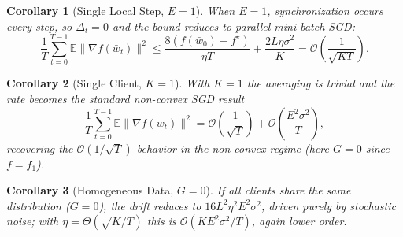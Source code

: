 \documentclass[11pt]{article}
\newtheorem{corollary}{Corollary}
\begin{document}
\begin{corollary}[Single Local Step, $E=1$]
When $E=1$, synchronization occurs every step, so $\Delta_t = 0$ and the bound
reduces to parallel mini-batch SGD:
\[
\frac{1}{T}\sum_{t=0}^{T-1}\mathbb{E}\|\nabla f(\bar w_t)\|^2
\le \frac{8(f(\bar w_0)-f^\star)}{\eta T} + \frac{2L\eta\sigma^2}{K}
= \mathcal{O}\!\left(\frac{1}{\sqrt{KT}}\right).
\]
\end{corollary}

\begin{corollary}[Single Client, $K=1$]
With $K=1$ the averaging is trivial and the rate becomes the standard
non-convex SGD result
\[
\frac{1}{T}\sum_{t=0}^{T-1}\mathbb{E}\|\nabla f(\bar w_t)\|^2
= \mathcal{O}\!\left(\frac{1}{\sqrt{T}}\right)
 + \mathcal{O}\!\left(\frac{E^2\sigma^2}{T}\right),
\]
recovering the $\mathcal{O}(1/\sqrt T)$ behavior in the non-convex regime
(here $G=0$ since $f=f_1$).
\end{corollary}

\begin{corollary}[Homogeneous Data, $G=0$]
If all clients share the same distribution ($G=0$), the drift reduces to
$16L^2\eta^2 E^2 \sigma^2$, driven purely by stochastic noise; with
$\eta=\Theta(\sqrt{K/T})$ this is $\mathcal{O}(KE^2\sigma^2/T)$, again
lower order.
\end{corollary}
\end{document}
